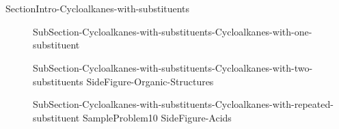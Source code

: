 \documentclass[main.tex]{subfiles}
\newcommand\chapterlabel{Ch-orgo}\setcounter{figurenewcounter}{0}\setcounter{tablenewcounter}{0}\setcounter{formulanewcounter}{0}
\begin{document}
\section{\color{blue!30!black}{Cycloalkanes with substituents}}
{SectionIntro-Cycloalkanes-with-substituents}
\sloppy
\begin{description}
\item[]{SubSection-Cycloalkanes-with-substituents-Cycloalkanes-with-one-substituent}
\item[] {SubSection-Cycloalkanes-with-substituents-Cycloalkanes-with-two-substituents}
{SideFigure-Organic-Structures}
\item[]{SubSection-Cycloalkanes-with-substituents-Cycloalkanes-with-repeated-substituent}
{SampleProblem10}
{SideFigure-Acids}

\end{description}
\end{document}
